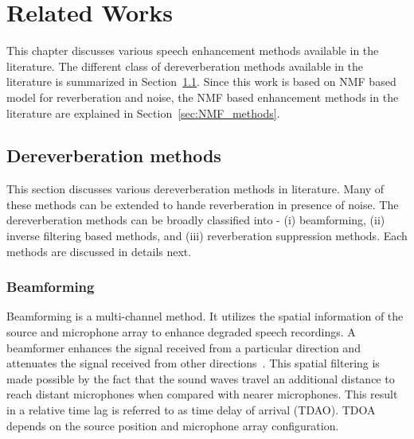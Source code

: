
\chapter{Related Works}
\label{chapter:lit}
This chapter discusses various speech enhancement methods available in the literature. The different class of dereverberation methods available in the literature is summarized in Section~\ref{sec:dereverb_methods}. Since this work is based on NMF based model for reverberation and noise, the NMF based enhancement methods in the literature are explained in Section~\ref{sec:NMF_methods}.

\section{Dereverberation methods}
\label{sec:dereverb_methods}


This section discusses various dereverberation methods in literature. Many of these methods can be extended to hande reverberation in presence of noise. The dereverberation methods can be broadly classified into - (i) beamforming, (ii) inverse filtering based methods, and (iii) reverberation suppression methods. Each methods are discussed in details next.

\subsection{Beamforming}

Beamforming is a multi-channel method. It utilizes the spatial information of the source and microphone array to enhance degraded speech recordings. A beamformer enhances the signal received from a particular direction and attenuates the signal received from other directions~\cite{naylor2010speech}. This spatial filtering is made possible by the fact that the sound waves travel an additional distance to reach distant microphones when compared with nearer microphones. This result in a relative time lag is referred to as time delay of arrival (TDAO). TDOA depends on the source position and microphone array configuration. 

